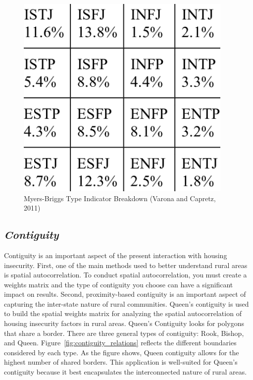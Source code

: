 \begin{figure}[htbp]
    \centering
    \includegraphics[width=\textwidth, height=10cm]{plots/association_rules.png}
    \caption[Myers-Briggs Type Indicator Breakdown]{Myers-Briggs Type Indicator Breakdown (Varona and Capretz, 2011)}
    \label{fig:ass_ch2}
\end{figure}

\pagebreak

\subsection{\textit{Contiguity}} 

Contiguity is an important aspect of the present interaction with housing insecurity. First, one of the main methods used to better understand rural areas is spatial autocorrelation. To conduct spatial autocorrelation, you must create a weights matrix and the type of contiguity you choose can have a significant impact on results. Second, proximity-based contiguity is an important aspect of capturing the inter-state nature of rural communities. Queen's contiguity is used to build the spatial weights matrix for analyzing the spatial autocorrelation of housing insecurity factors in rural areas. Queen's Contiguity looks for polygons that share a border. There are three general types of contiguity: Rook, Bishop, and Queen. Figure~\ref{fig:contiguity_relations} reflects the different boundaries considered by each type. As the figure shows, Queen contiguity allows for the highest number of shared borders.  This application is well-suited for Queen's contiguity because it best encapsulates the interconnected nature of rural areas.

